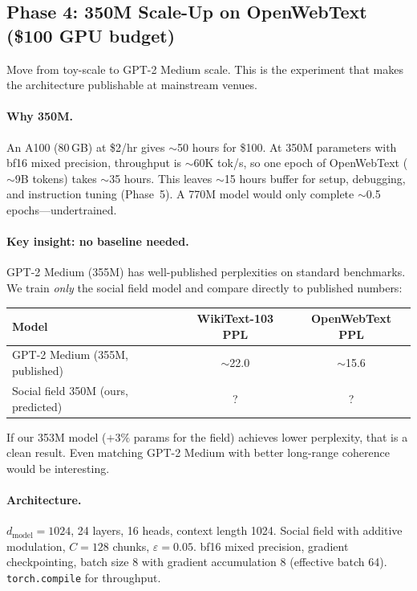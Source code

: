 \documentclass[11pt,a4paper]{article}
\begin{document}
\subsection{Phase 4: 350M Scale-Up on OpenWebText (\$100 GPU budget)}

Move from toy-scale to GPT-2 Medium scale.  This is the experiment
that makes the architecture publishable at mainstream venues.

\paragraph{Why 350M.}
An A100 (80\,GB) at \$2/hr gives $\sim$50 hours for \$100.  At 350M
parameters with bf16 mixed precision, throughput is $\sim$60K tok/s,
so one epoch of OpenWebText ($\sim$9B tokens) takes $\sim$35 hours.
This leaves $\sim$15 hours buffer for setup, debugging, and
instruction tuning (Phase~5).  A 770M model would only complete
$\sim$0.5 epochs---undertrained.

\paragraph{Key insight: no baseline needed.}
GPT-2 Medium (355M) has well-published perplexities on standard
benchmarks.  We train \emph{only} the social field model and compare
directly to published numbers:
\begin{center}
\begin{tabular}{lcc}
\toprule
\textbf{Model} & \textbf{WikiText-103 PPL} & \textbf{OpenWebText PPL} \\
\midrule
GPT-2 Medium (355M, published) & $\sim$22.0 & $\sim$15.6 \\
Social field 350M (ours, predicted) & ? & ? \\
\bottomrule
\end{tabular}
\end{center}
If our 353M model ($+3\%$ params for the field) achieves lower
perplexity, that is a clean result.  Even matching GPT-2 Medium with
better long-range coherence would be interesting.

\paragraph{Architecture.}
$d_{\text{model}} = 1024$, 24 layers, 16 heads, context length 1024.
Social field with additive modulation, $C = 128$ chunks,
$\varepsilon = 0.05$.  bf16 mixed precision, gradient checkpointing,
batch size 8 with gradient accumulation 8 (effective batch 64).
\texttt{torch.compile} for throughput.
\end{document}
